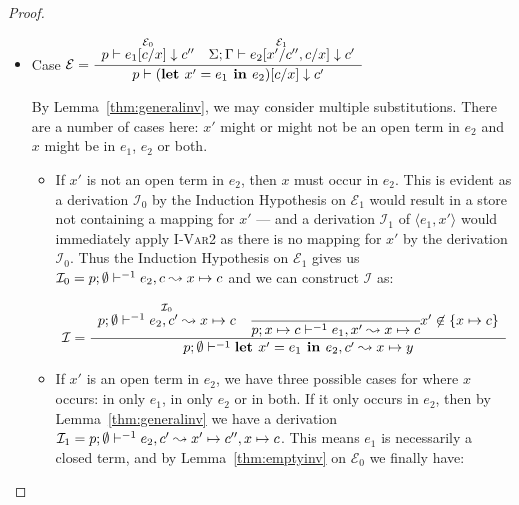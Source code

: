 \begin{proof}
\begin{itemize}
    \item Case $\mathcal{E} =
      \dfrac
        {\begin{array}{cc}
            \overset
              {\mathcal{E}_0}
              {p \vdash e_1 [c / x] \downarrow c''} &
            \overset
              {\mathcal{E}_1}
              {\Sigma;\Gamma\vdash e_2 [x' / c'', c / x] \downarrow c'}
         \end{array}
        }
        {p \vdash (\textbf{let } x' = e_1 \textbf{ in } e_2) [c / x] \downarrow c'}$

        By Lemma~\ref{thm:generalinv}, we may consider multiple substitutions.
        There are a number of cases here: $x'$ might or might not be an open
        term in $e_2$ and $x$ might be in $e_1$, $e_2$ or both.

     \begin{itemize}

       \item If $x'$ is not an open term in $e_2$, then $x$ must occur in
         $e_2$.  This is evident as a derivation $\mathcal{I}_0$ by the
         Induction Hypothesis on $\mathcal{E}_1$ would result in a store not
         containing a mapping for $x'$ --- and a derivation $\mathcal{I}_1$ of
         $\langle e_1, x' \rangle$ would immediately apply \textsc{I-Var2} as
         there is no mapping for $x'$ by the derivation $\mathcal{I}_0$. Thus
         the Induction Hypothesis on $\mathcal{E}_1$ gives us $\mathcal{I}_0 =
         p;\emptyset\vdash^{-1} e_2, c \leadsto x \mapsto c$ and we can construct
         $\mathcal{I}$ as:

         \begin{align*}
           \mathcal{I} = \cfrac
             {\begin{array}{cc}
                 \overset
                   {\mathcal{I}_0}
                   {p;\emptyset\vdash^{-1} e_2, c' \leadsto x \mapsto c} &
                   {\cfrac
                     {}
                     {p; x \mapsto c \vdash^{-1} e_1, x' \leadsto x \mapsto c}
                     x' \not\in \{ x \mapsto c \}
                   }
              \end{array}
            }
            {p;\emptyset\vdash^{-1} \textbf{let } x' = e_1 \textbf{ in } e_2, c' \leadsto x \mapsto y}
         \end{align*}

       \item If $x'$ is an open term in $e_2$, we have three possible cases for
         where $x$ occurs: in only $e_1$, in only $e_2$ or in both. If it only
         occurs in $e_2$, then by Lemma~\ref{thm:generalinv} we have a
         derivation $\mathcal{I}_1 = p;\emptyset\vdash^{-1} e_2, c' \leadsto x' \mapsto c'',
         x \mapsto c$. This means $e_1$ is necessarily a closed term, and by
         Lemma~\ref{thm:emptyinv} on $\mathcal{E}_0$ we finally have:


\end{itemize}
\end{itemize}
\end{proof}
